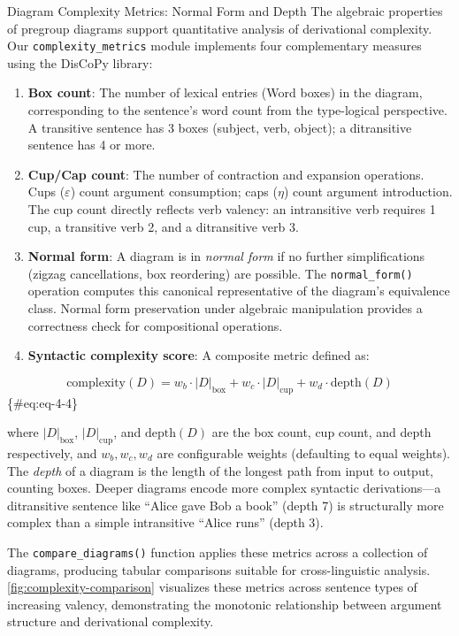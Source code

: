 \documentclass[
  ignorenonframetext,
]{beamer}
\begin{document}
\begin{frame}[fragile]{Diagram Complexity Metrics: Normal Form and
Depth}
\protect{}\label{diagram-complexity-metrics-normal-form-and-depth}
The algebraic properties of pregroup diagrams support quantitative
analysis of derivational complexity. Our \texttt{complexity\_metrics}
module implements four complementary measures using the DisCoPy library:

\begin{enumerate}
\item
  \textbf{Box count}: The number of lexical entries (Word boxes) in the
  diagram, corresponding to the sentence's word count from the
  type-logical perspective. A transitive sentence has 3 boxes (subject,
  verb, object); a ditransitive sentence has 4 or more.
\item
  \textbf{Cup/Cap count}: The number of contraction and expansion
  operations. Cups (\(\varepsilon\)) count argument consumption; caps
  (\(\eta\)) count argument introduction. The cup count directly
  reflects verb valency: an intransitive verb requires 1 cup, a
  transitive verb 2, and a ditransitive verb 3.
\item
  \textbf{Normal form}: A diagram is in \emph{normal form} if no further
  simplifications (zigzag cancellations, box reordering) are possible.
  The \texttt{normal\_form()} operation computes this canonical
  representative of the diagram's equivalence class. Normal form
  preservation under algebraic manipulation provides a correctness check
  for compositional operations.
\item
  \textbf{Syntactic complexity score}: A composite metric defined as:
\end{enumerate}

\[\text{complexity}(D) = w_b \cdot |D|_{\text{box}} + w_c \cdot |D|_{\text{cup}} + w_d \cdot \text{depth}(D) \]
\{\#eq:eq-4-4\}

where \(|D|_{\text{box}}\), \(|D|_{\text{cup}}\), and
\(\text{depth}(D)\) are the box count, cup count, and depth
respectively, and \(w_b, w_c, w_d\) are configurable weights (defaulting
to equal weights). The \emph{depth} of a diagram is the length of the
longest path from input to output, counting boxes. Deeper diagrams
encode more complex syntactic derivations---a ditransitive sentence like
``Alice gave Bob a book'' (depth 7) is structurally more complex than a
simple intransitive ``Alice runs'' (depth 3).

The \texttt{compare\_diagrams()} function applies these metrics across a
collection of diagrams, producing tabular comparisons suitable for
cross-linguistic analysis. \autoref{fig:complexity-comparison}
visualizes these metrics across sentence types of increasing valency,
demonstrating the monotonic relationship between argument structure and
derivational complexity.


\end{frame}
\end{document}
